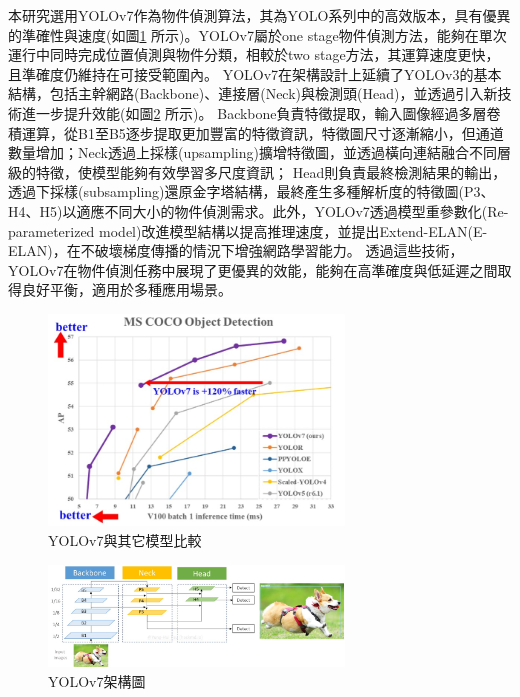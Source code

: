 \documentclass[12pt]{article}       %
\renewcommand{\figurename}{圖}                           %
\begin{document}
本研究選用YOLOv7\cite{wang2023yolov7}作為物件偵測算法，其為YOLO系列中的高效版本，具有優異的準確性與速度(如圖\ref{fig:yolov7_2} 所示)。YOLOv7屬於one stage物件偵測方法，能夠在單次運行中同時完成位置偵測與物件分類，相較於two stage方法，其運算速度更快，且準確度仍維持在可接受範圍內。
YOLOv7在架構設計上延續了YOLOv3的基本結構，包括主幹網路(Backbone)、連接層(Neck)與檢測頭(Head)，並透過引入新技術進一步提升效能(如圖\ref{fig:yolov7_3} 所示)。
Backbone負責特徵提取，輸入圖像經過多層卷積運算，從B1至B5逐步提取更加豐富的特徵資訊，特徵圖尺寸逐漸縮小，但通道數量增加；Neck透過上採樣(upsampling)擴增特徵圖，並透過橫向連結融合不同層級的特徵，使模型能夠有效學習多尺度資訊；
Head則負責最終檢測結果的輸出，透過下採樣(subsampling)還原金字塔結構，最終產生多種解析度的特徵圖(P3、H4、H5)以適應不同大小的物件偵測需求。此外，YOLOv7透過模型重參數化(Re-parameterized model)改進模型結構以提高推理速度，並提出Extend-ELAN(E-ELAN)，在不破壞梯度傳播的情況下增強網路學習能力。
透過這些技術，YOLOv7在物件偵測任務中展現了更優異的效能，能夠在高準確度與低延遲之間取得良好平衡，適用於多種應用場景。

\begin{figure}[H]
    \centering
    \renewcommand{\figurename}{圖}                              %
    \includegraphics[width=0.7\textwidth]{yolov7_2.jpg}         %
    \caption{YOLOv7與其它模型比較\cite{wang2023yolov7}}           %
    \label{fig:yolov7_2}                                        %
\end{figure}

\begin{figure}[H]
    \centering
    \renewcommand{\figurename}{圖} %
    \includegraphics[width=0.7\textwidth]{yolov7_3.jpg}     %
    \caption{YOLOv7架構圖\cite{hackmd}}    %
    \label{fig:yolov7_3}    %
\end{figure}
\end{document}

